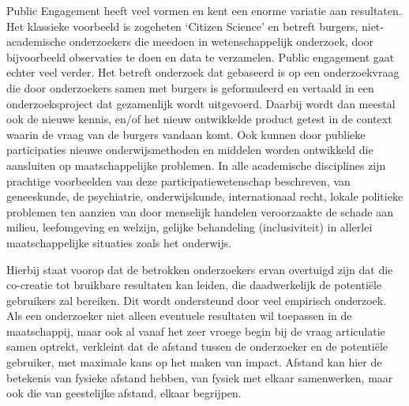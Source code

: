 \documentclass{jote-book}
\begin{document}
	Public Engagement heeft veel vormen en kent een enorme variatie aan resultaten. Het klassieke voorbeeld is zogeheten ‘Citizen Science' en betreft burgers, niet-academische onderzoekers die meedoen in wetenschappelijk onderzoek, door bijvoorbeeld observaties te doen en data te verzamelen. Public engagement gaat echter veel verder. Het betreft onderzoek dat gebaseerd is op een onderzoekvraag die door onderzoekers samen met burgers is geformuleerd en vertaald in een onderzoeksproject dat gezamenlijk wordt uitgevoerd. Daarbij wordt dan meestal ook de nieuwe kennis, en/of het nieuw ontwikkelde product getest in de context waarin de vraag van de burgers vandaan komt. Ook kunnen door publieke participaties nieuwe onderwijsmethoden en middelen worden ontwikkeld die aansluiten op maatschappelijke problemen. In alle academische disciplines zijn prachtige voorbeelden van deze participatiewetenschap beschreven, van geneeskunde, de psychiatrie, onderwijskunde, internationaal recht, lokale politieke problemen ten aanzien van door menselijk handelen veroorzaakte de schade aan milieu, leefomgeving en welzijn, gelijke behandeling (inclusiviteit) in allerlei maatschappelijke situaties zoals het onderwijs.



	Hierbij staat voorop dat de betrokken onderzoekers ervan overtuigd zijn dat die co-creatie tot bruikbare resultaten kan leiden, die daadwerkelijk de potentiële gebruikers zal bereiken. Dit wordt ondersteund door veel empirisch onderzoek. Als een onderzoeker niet alleen eventuele resultaten wil toepassen in de maatschappij, maar ook al vanaf het zeer vroege begin bij de vraag articulatie samen optrekt, verkleint dat de afstand tussen de onderzoeker en de potentiële gebruiker, met maximale kans op het maken van impact. Afstand kan hier de betekenis van fysieke afstand hebben, van fysiek met elkaar samenwerken, maar ook die van geestelijke afstand, elkaar begrijpen.
\end{document}
